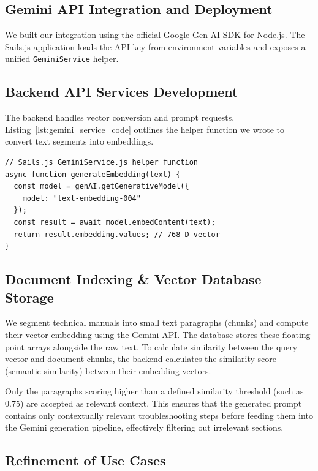 \documentclass[12pt,a4paper]{report}
\begin{document}
\subsection{Gemini API Integration and Deployment}

\label{lst:gemini_service}
We built our integration using the official Google Gen AI SDK for Node.js. The Sails.js application loads the API key from environment variables and exposes a unified \texttt{GeminiService} helper.

\subsection{Backend API Services Development}

The backend handles vector conversion and prompt requests. Listing~\ref{lst:gemini_service_code} outlines the helper function we wrote to convert text segments into embeddings.

\begin{verbatim}
// Sails.js GeminiService.js helper function
async function generateEmbedding(text) {
  const model = genAI.getGenerativeModel({
    model: "text-embedding-004"
  });
  const result = await model.embedContent(text);
  return result.embedding.values; // 768-D vector
}
\end{verbatim}
\label{lst:gemini_service_code}

\subsection{Document Indexing \& Vector Database Storage}

We segment technical manuals into small text paragraphs (chunks) and compute their vector embedding using the Gemini API. The database stores these floating-point arrays alongside the raw text. To calculate similarity between the query vector and document chunks, the backend calculates the similarity score (semantic similarity) between their embedding vectors. 

Only the paragraphs scoring higher than a defined similarity threshold (such as $0.75$) are accepted as relevant context. This ensures that the generated prompt contains only contextually relevant troubleshooting steps before feeding them into the Gemini generation pipeline, effectively filtering out irrelevant sections.

\subsection{Refinement of Use Cases}
\end{document}
